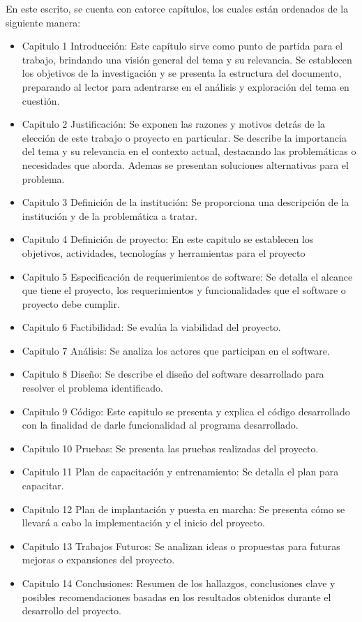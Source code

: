 En este escrito, se cuenta con catorce capítulos, los cuales están ordenados de la siguiente manera:
\begin{itemize}
    \item Capitulo 1 Introducción: Este capítulo sirve como punto de partida para el trabajo, brindando una visión general del tema y su relevancia. Se establecen los objetivos de la investigación y se presenta la estructura del documento, preparando al lector para adentrarse en el análisis y exploración del tema en cuestión.
    \item Capitulo 2 Justificación: Se exponen las razones y motivos detrás de la elección de este trabajo o proyecto en particular. Se describe la importancia del tema y su relevancia en el contexto actual, destacando las problemáticas o necesidades que aborda. Ademas se presentan soluciones alternativas para el problema.
    \item Capitulo 3 Definición de la institución: Se proporciona una descripción de la institución y de la problemática a tratar.
    \item Capitulo 4 Definición de proyecto: En este capitulo se establecen los objetivos, actividades, tecnologías y herramientas para el proyecto
    \item Capitulo 5 Especificación de requerimientos de software: Se detalla el alcance que tiene el proyecto, los requerimientos y funcionalidades que el software o proyecto debe cumplir.
    \item Capitulo 6 Factibilidad: Se evalúa la viabilidad del proyecto.
    \item Capitulo 7 Análisis: Se analiza los actores que participan en el software.
    \item Capitulo 8 Diseño: Se describe el diseño del software desarrollado para resolver el problema identificado.
    \item Capitulo 9 Código: Este capitulo se presenta y explica el código desarrollado con la finalidad de darle funcionalidad al programa desarrollado.
    \item Capitulo 10 Pruebas: Se presenta las pruebas realizadas del proyecto.
    \item Capitulo 11 Plan de capacitación y entrenamiento: Se detalla el plan para capacitar.
    \item Capitulo 12 Plan de implantación y puesta en marcha: Se presenta cómo se llevará a cabo la implementación y el inicio del proyecto.
    \item Capitulo 13 Trabajos Futuros: Se analizan ideas o propuestas para futuras mejoras o expansiones del proyecto.
    \item Capitulo 14 Conclusiones: Resumen de los hallazgos, conclusiones clave y posibles recomendaciones basadas en los resultados obtenidos durante el desarrollo del proyecto.
\end{itemize}